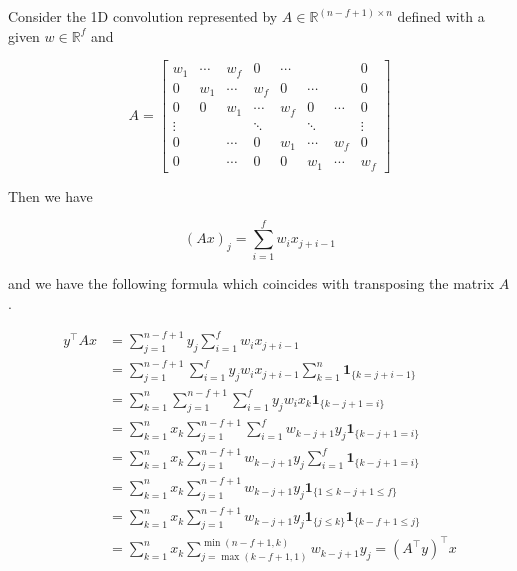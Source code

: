 \begin{example}
    Consider the 1D convolution represented by $A \in \mathbb{R}^{(n-f+1) \times n}$ defined with a given $w \in \mathbb{R}^{f}$ and

    $$
    A=\left[\begin{array}{cccccccc}
    w_{1} & \cdots & w_{f} & 0 & \cdots & & & 0 \\
    0 & w_{1} & \cdots & w_{f} & 0 & \cdots & & 0 \\
    0 & 0 & w_{1} & \cdots & w_{f} & 0 & \cdots & 0 \\
    \vdots & & & \ddots & & \ddots & & \vdots \\
    0 & & \cdots & 0 & w_{1} & \cdots & w_{f} & 0 \\
    0 & & \cdots & 0 & 0 & w_{1} & \cdots & w_{f}
    \end{array}\right]
    $$

    Then we have

    $$
    (A x)_{j}=\sum_{i=1}^{f} w_{i} x_{j+i-1}
    $$

    \par\noindent\textcolor{gray}{\hdashrule{\textwidth}{0.4pt}{1pt 2pt}}

    and we have the following formula which coincides with transposing the matrix $A$.

    $$
    \begin{aligned}
    y^{\top} A x & =\sum_{j=1}^{n-f+1} y_{j} \sum_{i=1}^{f} w_{i} x_{j+i-1} \\
    & =\sum_{j=1}^{n-f+1} \sum_{i=1}^{f} y_{j} w_{i} x_{j+i-1} \sum_{k=1}^{n} \mathbf{1}_{\{k=j+i-1\}} \\
    & =\sum_{k=1}^{n} \sum_{j=1}^{n-f+1} \sum_{i=1}^{f} y_{j} w_{i} x_{k} \mathbf{1}_{\{k-j+1=i\}} \\
    & =\sum_{k=1}^{n} x_{k} \sum_{j=1}^{n-f+1} \sum_{i=1}^{f} w_{k-j+1} y_{j} \mathbf{1}_{\{k-j+1=i\}} \\
    & =\sum_{k=1}^{n} x_{k} \sum_{j=1}^{n-f+1} w_{k-j+1} y_{j} \sum_{i=1}^{f} \mathbf{1}_{\{k-j+1=i\}} \\
    & =\sum_{k=1}^{n} x_{k} \sum_{j=1}^{n-f+1} w_{k-j+1} y_{j} \mathbf{1}_{\{1 \leq k-j+1 \leq f\}} \\
    & =\sum_{k=1}^{n} x_{k} \sum_{j=1}^{n-f+1} w_{k-j+1} y_{j} \mathbf{1}_{\{j \leq k\}} \mathbf{1}_{\{k-f+1 \leq j\}} \\
    & =\sum_{k=1}^{n} x_{k} \sum_{j=\max (k-f+1,1)}^{\min (n-f+1, k)} w_{k-j+1} y_{j}=\left(A^{\top} y\right)^{\top} x \\
    \end{aligned}
    $$
\end{example}

